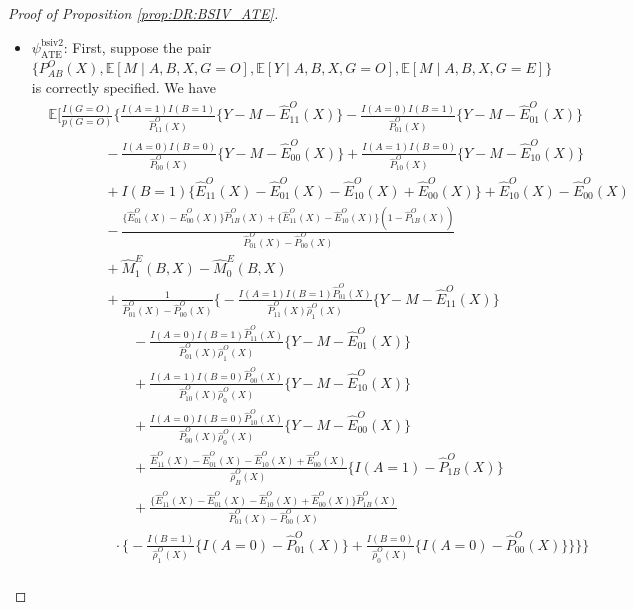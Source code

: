 \documentclass[10pt]{article}
\newcommand{\E}{\mathbb{E}}
\begin{document}
\begin{proof}[Proof of Proposition \ref{prop:DR:BSIV_ATE}]
\begin{itemize}
    \item $\psi_{\text{ATE}}^{\text{bsiv2}}$:
    First, suppose the pair $\{P_{AB}^O(X),\mathbb{E}[M\mid A,B,X,G=O],\mathbb{E}[Y\mid A,B,X,G=O],\mathbb{E}[M\mid A,B,X,G=E]\}$ is correctly specified. We have
    \begingroup
\allowdisplaybreaks
{\footnotesize \begin{align*}
&\E\Big[\frac{I(G=O)}{p(G=O)}\Bigg\{\frac{I(A=1)I(B=1)}{\hat{P}_{11}^O(X)}\{Y-M-\hat{E}_{11}^O(X)\}-\frac{I(A=0)I(B=1)}{\hat{P}_{01}^O(X)}\{Y-M-\hat{E}_{01}^O(X)\}\\
    &\ \ \ \ \ \ \ \ \ \ \ \ \ \ \ \ \ \ -\frac{I(A=0)I(B=0)}{\hat{P}_{00}^O(X)}\{Y-M-\hat{E}_{00}^O(X)\}+\frac{I(A=1)I(B=0)}{\hat{P}_{10}^O(X)}\{Y-M-\hat{E}_{10}^O(X)\}\\
    &\ \ \ \ \ \ \ \ \ \ \ \ \ \ \ \ \ \ +I(B=1)\{\hat{E}_{11}^O(X)-\hat{E}_{01}^O(X)-\hat{E}_{10}^O(X)+\hat{E}_{00}^O(X)\}+\hat{E}_{10}^O(X)-\hat{E}_{00}^O(X)\\
    &\ \ \ \ \ \ \ \ \ \ \ \ \ \ \ \ \ \ -\frac{\{\hat{E}_{01}^O(X)-\hat{E}_{00}^O(X)\}\hat{P}_{1B}^O(X)+\{\hat{E}_{11}^O(X)-\hat{E}_{10}^O(X)\}(1-\hat{P}_{1B}^O(X))}{\hat{P}_{01}^O(X)-\hat{P}_{00}^O(X)}\\
    &\ \ \ \ \ \ \ \ \ \ \ \ \ \ \ \ \ \ +\hat{M}_1^E(B,X)-\hat{M}_0^E(B,X)\\
    &\ \ \ \ \ \ \ \ \ \ \ \ \ \ \ \ \ \ +\frac{1}{\hat{P}_{01}^O(X)-\hat{P}_{00}^O(X)}\bigg\{-\frac{I(A=1)I(B=1)\hat{P}_{01}^O(X)}{\hat{P}_{11}^O(X)\hat{\rho}_1^O(X)}\{Y-M-\hat{E}_{11}^O(X)\}\\
    &~~~~~~~~~~~~~~~~~~~~~~~~~~~-\frac{I(A=0)I(B=1)\hat{P}_{11}^O(X)}{\hat{P}_{01}^O(X)\hat{\rho}_1^O(X)}\{Y-M-\hat{E}_{01}^O(X)\}\\
    &~~~~~~~~~~~~~~~~~~~~~~~~~~~+\frac{I(A=1)I(B=0)\hat{P}_{00}^O(X)}{\hat{P}_{10}^O(X)\hat{\rho}_0^O(X)}\{Y-M-\hat{E}_{10}^O(X)\}\\
    &~~~~~~~~~~~~~~~~~~~~~~~~~~~+\frac{I(A=0)I(B=0)\hat{P}_{10}^O(X)}{\hat{P}_{00}^O(X)\hat{\rho}_0^O(X)}\{Y-M-\hat{E}_{00}^O(X)\}\\
    &~~~~~~~~~~~~~~~~~~~~~~~~~~~+\frac{\hat{E}_{11}^O(X)-\hat{E}_{01}^O(X)-\hat{E}_{10}^O(X)+\hat{E}_{00}^O(X)}{\hat{\rho}_B^O(X)}\big\{I(A=1)-\hat{P}_{1B}^O(X)\big\}\\
    &~~~~~~~~~~~~~~~~~~~~~~~~~~~ +\frac{\{\hat{E}_{11}^O(X)-\hat{E}_{01}^O(X)-\hat{E}_{10}^O(X)+\hat{E}_{00}^O(X)\}\hat{P}_{1B}^O(X)}{\hat{P}_{01}^O(X)-\hat{P}_{00}^O(X)}\\
    &~~~~~~~~~~~~~~~~~~~~~\cdot\big\{-\frac{I(B=1)}{\hat{\rho}_1^O(X)}\{I(A=0)-\hat{P}_{01}^O(X)\}+\frac{I(B=0)}{\hat{\rho}_0^O(X)}\{I(A=0)-\hat{P}_{00}^O(X)\}\big\}\bigg\}\Bigg\}\\

\end{align*}}
\end{itemize}
\end{proof}
\end{document}
